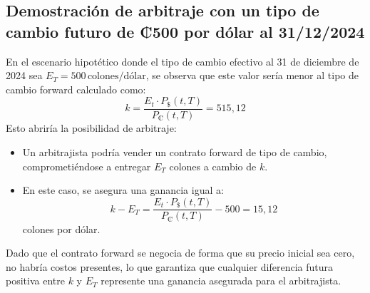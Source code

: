 \documentclass[12pt]{article}
\begin{document}
\subsection*{Demostración de arbitraje con un tipo de cambio futuro de ₡500 por dólar al 31/12/2024}

En el escenario hipotético donde el tipo de cambio efectivo al 31 de diciembre de 2024 sea \( E_T = 500 \, \text{colones/dólar} \), se observa que este valor sería menor al tipo de cambio forward calculado como:
\[
k = \frac{E_t \cdot P_{\$}(t, T)}{P_{\text{₡}}(t, T)} = 515,12
\]
Esto abriría la posibilidad de arbitraje:

\begin{itemize}
    \item Un arbitrajista podría vender un contrato forward de tipo de cambio, comprometiéndose a entregar \( E_T \) colones a cambio de \( k \).
    \item En este caso, se asegura una ganancia igual a:
    \[
    k - E_T = \frac{E_t \cdot P_{\text{\$}}(t, T)}{P_{\text{₡}}(t, T)} - 500 = 15,12
    \]
    colones por dólar.
\end{itemize}

Dado que el contrato forward se negocia de forma que su precio inicial sea cero, no habría costos presentes, lo que garantiza que cualquier diferencia futura positiva entre \( k \) y \( E_T \) represente una ganancia asegurada para el arbitrajista.

\end{document}
